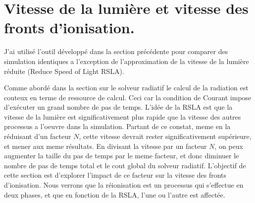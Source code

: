 \chapter{Vitesse de la lumière et vitesse des fronts d'ionisation.}

J'ai utilisé l'outil développé dans la section précédente pour comparer des simulation identiques a l'exception de l'approximation de la vitesse de la lumière réduite (Reduce Speed of Light RSLA).

Comme abordé dans la section sur le solveur radiatif %
le calcul de la radiation est couteux en terme de ressource de calcul.
Ceci car la condition de Courant impose d'exécuter un grand nombre de pas de temps.
L'idée de la RSLA est que la vitesse de la lumière est significativement plus rapide que la vitesse des autres processus a l'oeuvre dans la simulation.
Partant de ce constat, meme en la réduisant d'un facteur $N$, cette vitesse devrait rester significativement supérieure, et mener aux meme résultats.
En divisant la vitesse par un facteur $N$, on peux augmenter la taille du pas de temps par le meme facteur, et donc diminuer le nombre de pas de temps total et le cout global du solveur radiatif.
L'objectif de cette section est d'explorer l'impact de ce facteur sur la vitesse des fronts d'ionisation.
Nous verrons que la réionisation est un processus qui s'effectue en deux phases, et que en fonction de la RSLA, l'une ou l'autre est affectée.




